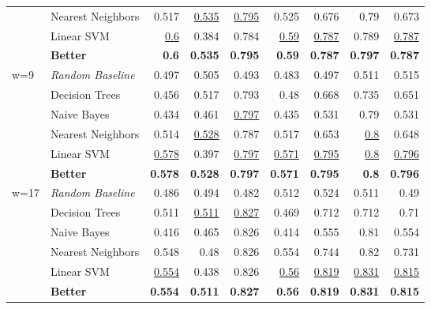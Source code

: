 \documentclass[runningheads]{llncs}
\begin{document}
\begin{table*}[t]
\begin{tabular}{l@{\hskip 0.1in}l@{\hskip 0.1in}r@{\hskip 0.1in}r@{\hskip 0.1in}r@{\hskip 0.1in}r@{\hskip 0.1in}r@{\hskip 0.1in}r@{\hskip 0.1in}r}
		& Nearest Neighbors        & 0.517          & \underline{0.535}    & \underline{0.795}    & 0.525          & 0.676          & 0.79           & 0.673          \\
		& Linear SVM               & \underline{0.6}      & 0.384          & 0.784          & \underline{0.59}     & \underline{0.787}    & 0.789          & \underline{0.787}    \\    \midrule
		& \textbf{Better}          & \textbf{0.6}   & \textbf{0.535} & \textbf{0.795} & \textbf{0.59}  & \textbf{0.787} & \textbf{0.797} & \textbf{0.787} \\    \bottomrule
	w=9	& \textit{Random Baseline} & 0.497          & 0.505          & 0.493          & 0.483          & 0.497          & 0.511          & 0.515          \\
		& Decision Trees           & 0.456          & 0.517          & 0.793          & 0.48           & 0.668          & 0.735          & 0.651          \\
		& Naive Bayes              & 0.434          & 0.461          & \underline{0.797}    & 0.435          & 0.531          & 0.79           & 0.531          \\
		& Nearest Neighbors        & 0.514          & \underline{0.528}    & 0.787          & 0.517          & 0.653          & \underline{0.8}      & 0.648          \\
		& Linear SVM   				& \underline{0.578}    & 0.397          & \underline{0.797}    & \underline{0.571}    & \underline{0.795}    & \underline{0.8}      & \underline{0.796}    \\     \midrule
		& \textbf{Better}          & \textbf{0.578} & \textbf{0.528} & \textbf{0.797} & \textbf{0.571} & \textbf{0.795} & \textbf{0.8}   & \textbf{0.796} \\    \bottomrule
	w=17	& \textit{Random Baseline} & 0.486          & 0.494          & 0.482          & 0.512          & 0.524          & 0.511          & 0.49           \\
		& Decision Trees           & 0.511          & \underline{0.511}    & \underline{0.827}    & 0.469          & 0.712          & 0.712          & 0.71           \\
		& Naive Bayes              & 0.416          & 0.465          & 0.826          & 0.414          & 0.555          & 0.81           & 0.554          \\
		& Nearest Neighbors        & 0.548          & 0.48           & 0.826          & 0.554          & 0.744          & 0.82           & 0.731          \\
		& Linear SVM               & \underline{0.554}    & 0.438          & 0.826          & \underline{0.56}     & \underline{0.819}    & \underline{0.831}    & \underline{0.815}    \\    \midrule
		& \textbf{Better}          & \textbf{0.554} & \textbf{0.511} & \textbf{0.827} & \textbf{0.56}  & \textbf{0.819} & \textbf{0.831} & \textbf{0.815}	\\    \bottomrule
	\end{tabular}
\end{table*}
\end{document}
